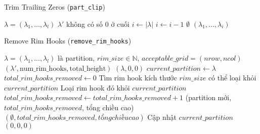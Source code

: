 \begin{algorithm}[H]
\caption{Trim Trailing Zeros (\texttt{part\_clip})}
\begin{algorithmic}[1]
\REQUIRE $\lambda = (\lambda_1, ..., \lambda_l)$
\ENSURE $\lambda'$ không có số 0 ở cuối
\STATE $i \gets |\lambda|$
    \STATE $i \gets i - 1$
\ENDWHILE
{}
    \RETURN $\emptyset$
\ENDIF
\RETURN $(\lambda_1, ..., \lambda_i)$
\end{algorithmic}
\end{algorithm}

\begin{algorithm}[H]
\caption{Remove Rim Hooks (\texttt{remove\_rim\_hooks})}
\begin{algorithmic}[1]
\REQUIRE $\lambda = (\lambda_1, ..., \lambda_l)$ là partition, $rim\_size \in \mathbb{N}$, $acceptable\_grid = (nrow, ncol)$
\ENSURE $(\lambda', \text{num\_rim\_hooks}, \text{total\_height})$
    \RETURN $(\lambda, 0, 0)$
\ENDIF
\STATE $current\_partition \gets \lambda$
\STATE $total\_rim\_hooks\_removed \gets 0$
    \STATE Tìm rim hook kích thước $rim\_size$ có thể loại khỏi $current\_partition$
        \STATE Loại rim hook đó khỏi $current\_partition$
        \STATE $total\_rim\_hooks\_removed \gets total\_rim\_hooks\_removed + 1$
            \RETURN (partition mới, $total\_rim\_hooks\_removed$, tổng chiều cao)
        \ENDIF
            \RETURN $(\emptyset, total\_rim\_hooks\_removed, tổng chiều cao)$
        \ENDIF
        \STATE Cập nhật $current\_partition$
    \ELSE
        \RETURN $(0, 0, 0)$
    \ENDIF
\ENDWHILE
\end{algorithmic}
\end{algorithm}